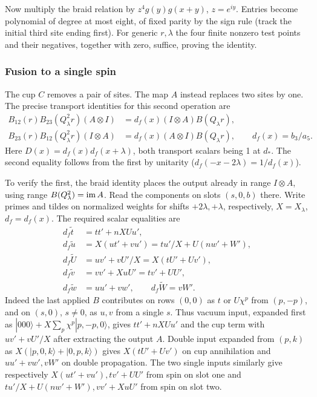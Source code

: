 Now multiply the braid relation by \(z^4 g(y)g(x+y)\), \(z=e^{iy}\). Entries become polynomial of degree at most eight, of fixed parity by the sign rule (track the initial third site ending first). For generic \(r,\lambda\) the four finite nonzero test points and their negatives, together with zero, suffice, proving the identity.

\subsubsection{Fusion to a single spin}

The cup $C$ removes a pair of sites. The map $A$ instead replaces two sites
by one. The precise transport identities for this second operation are
\[
 \begin{aligned}
 B_{12}(r)B_{23}(Q_\lambda^2 r)(A\otimes I)&=d_f(x)(I\otimes A)B(Q_\lambda r),\\
 B_{23}(r)B_{12}(Q_\lambda^2 r)(I\otimes A)&=d_f(x)(A\otimes I)B(Q_\lambda r),\qquad d_f(x)=b_3/a_5.
 \end{aligned}
\]
Here \(D(x)=d_f(x)d_f(x+\lambda)\), both transport scalars being 1 at \(d_*\). The second equality follows from the first by unitarity (\(d_f(-x-2\lambda)=1/d_f(x)\)).

To verify the first, the braid identity places the output already in range \(I\otimes A\), using range \(B(Q_\lambda^2)={\rm im}\, A\). Read the components on slots \((s,0,b)\) there. Write primes and tildes on normalized weights for shifts \(+2\lambda,+\lambda\), respectively, \(X=X_\lambda\), \(d_f=d_f(x)\). The required scalar equalities are
\[
 \begin{aligned}
 d_f\tilde t&=t t'+n X U u',\\
 d_f\tilde u&=X(u t'+v u')=t u'/X+U(n w'+W'),\\
 d_f\tilde U&=u v'+v U'/X=X(t U'+U v'),\\
 d_f\tilde v&=v v'+X u U'=t v'+U U',\\
 d_f\tilde w&=u u'+v w',\qquad d_f\tilde W=v W'.
 \end{aligned}
\]
Indeed the last applied \(B\) contributes on rows \((0,0)\) as \(t\) or \(U\chi^p\) from \((p,-p)\), and on \((s,0)\), \(s\ne0\), as \(u,v\) from a single \(s\). Thus vacuum input, expanded first as \(|000\rangle+X\sum_p\chi^p|p,-p,0\rangle\), gives \(tt'+n X Uu'\) and the cup term with \(u v'+v U'/X\) after extracting the output \(A\). Double input expanded from \((p,k)\) as \(X(|p,0,k\rangle+|0,p,k\rangle)\) gives \(X(t U'+U v')\) on cup annihilation and \(u u'+v w',v W'\) on double propagation. The two single inputs similarly give respectively \(X(u t'+v u'),t v'+U U'\) from spin on slot one and \(t u'/X+U(n w'+W'),v v'+X u U'\) from spin on slot two.


